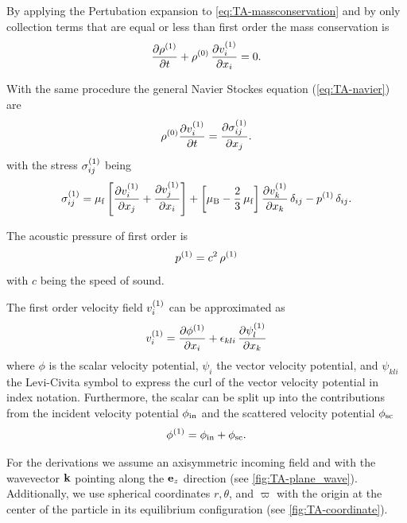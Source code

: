 By applying the Pertubation expansion to \cref{eq:TA-massconservation} and by 
only collection terms that are equal or less than first order the mass 
conservation is
\begin{equation}
  \pdv{  \rho^{(1)}  }{t} + 
  \rho^{(0)}\,\pdv{  v_{i}^{(1)}  }{x_{i}} = 0.
  \label{eq:TA-st-massconservation}
\end{equation}

With the same procedure the general Navier Stockes equation 
(\cref{eq:TA-navier}) are
\begin{equation}
  \rho^{(0)} \pdv{  v_{i}^{(1)}  }{t} = 
  \pdv{  \sigma_{ij}^{(1)}  }{x_{j}}.
  \label{eq:TA-st-navier}
\end{equation}
with the stress $\sigma_{ij}^{(1)}$ being
\begin{equation}
  \sigma_{ij}^{(1)} = \mu_{\mathrm{f}}\left[ \pdv{  v_{i}^{(1)}  }{x_{j}} + 
  \pdv{  v_{j}^{(1)}  }{x_{i}} \right] + \left[ \mu_{\mathrm{B}} - 
  \frac{2}{3}\,\mu_{\mathrm{f}} \right] \pdv{  v_{k}^{(1)}  }{x_{k}} \,\delta_{ij} - 
  p^{(1)}\,\delta_{ij}.
  \label{eq:TA-st-stress}
\end{equation}

The acoustic pressure of first order is
\begin{equation}
  p^{(1)} = c^{2}\,\rho^{(1)}
  \label{eq:TA-st-pre}
\end{equation}
with $c$ being the speed of sound.

The first order velocity field $v_{i}^{(1)}$ can be approximated as
\begin{equation}
  v^{(1)}_{i} = \pdv{  \phi^{(1)}  }{x_{i}} + 
  \epsilon_{kli}\,\pdv{  \psi^{(1)}  _{l}}{x_{k}}
  \label{eq:TA-st-vel}
\end{equation}
where $\phi$ is the scalar velocity potential, $\psi_{i}$ the vector 
velocity potential, and $\psi_{kli}$ the Levi-Civita symbol to express the curl 
of the vector velocity potential in index notation. Furthermore, the scalar can 
be split up into the contributions from the incident velocity potential 
$\phi_{\mathrm{in}}$ and the scattered velocity potential $\phi_{\mathrm{sc}}$
\begin{equation}
  \phi^{(1)} = \phi_{\mathrm{in}} + \phi_{\mathrm{sc}}.
  \label{eq:TA-scalar-potential}
\end{equation}

For the derivations we assume an axisymmetric incoming field and with the 
wavevector $\vb{k}$ pointing along the $\vb{e}_{z}$ direction (see 
\cref{fig:TA-plane_wave}). Additionally, we use spherical coordinates $r, 
\theta$, and $\varpi$ with the origin at the center of the particle in its 
equilibrium configuration (see \cref{fig:TA-coordinate}).

